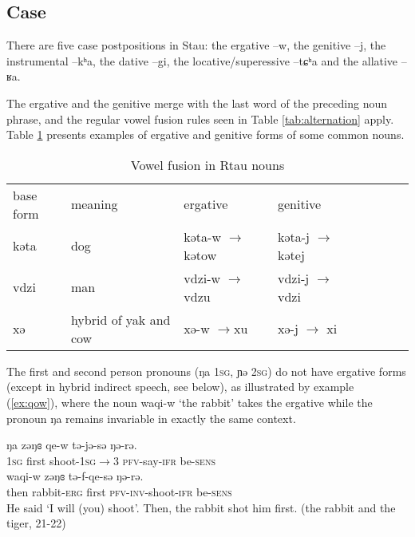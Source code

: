 \documentclass[oneside,a4paper,11pt]{article}
\newcommand{\ipa}[1]{{\phon #1}} %
\begin{document}
\subsection{Case} 
There are five case postpositions in Stau: the ergative \ipa{--w}, the genitive \ipa{--j}, the instrumental \ipa{--kʰa}, the dative \ipa{--gi}, the locative/superessive \ipa{--tɕʰa} and the allative \ipa{--ʁa}.


The ergative and the genitive merge with the last word of the preceding noun phrase, and the regular vowel fusion rules seen in Table \ref{tab:alternation} apply. Table \ref{tab:alternation.noun} presents examples of ergative and genitive forms of some common nouns.

\begin{table}[H]
\caption{Vowel fusion in Rtau nouns} \label{tab:alternation.noun} \centering
\begin{tabular}{l|lllllll}
\toprule
base form & meaning & ergative & genitive \\
\cline{1-4}
\ipa{kəta} & dog & \ipa{kəta-w} $\rightarrow$ \ipa{kətow} & \ipa{kəta-j} $\rightarrow$ \ipa{kətej} & \\
\ipa{vdzi} & man & \ipa{vdzi-w} $\rightarrow$  \ipa{vdzu} & \ipa{vdzi-j} $\rightarrow$ \ipa{vdzi} & \\
\ipa{xə} & hybrid of yak and cow &\ipa{xə-w}  $\rightarrow$\ipa{xu} & \ipa{xə-j} $\rightarrow$ \ipa{xi} & \\
\bottomrule
\end{tabular}
\end{table}

The first and second person pronouns (\ipa{ŋa} \textsc{1sg}, \ipa{ɲə} \textsc{2sg}) do not have ergative forms (except in hybrid indirect speech, see below), as illustrated by example (\ref{ex:qow}), where the noun \ipa{waqi-w}  `the rabbit' takes the ergative while the pronoun \ipa{ŋa} remains invariable in exactly the same context.
 \begin{exe}
\ex \label{ex:qow}
\gll
\ipa{ŋa} 	\ipa{zəŋɞ} 	\ipa{qe-w} \ipa{tə-jə-sə} 	\ipa{ŋə-rə.} \\
\textsc{1sg} first shoot-\textsc{1sg$\rightarrow$3} \textsc{pfv}-say-\textsc{ifr} be-\textsc{sens}\\
\gll \ipa{tɕʰəge,} 	\ipa{waqi-w} 	\ipa{zəŋɞ} 	\ipa{tə-f-qe-sə} 	\ipa{ŋə-rə.} 	\\
then rabbit-\textsc{erg} first \textsc{pfv-inv}-shoot-\textsc{ifr} be-\textsc{sens}\\
\glt He said `I will (you) shoot'. Then, the rabbit shot him first. (the rabbit and the tiger, 21-22)
\end{exe}
\end{document}
